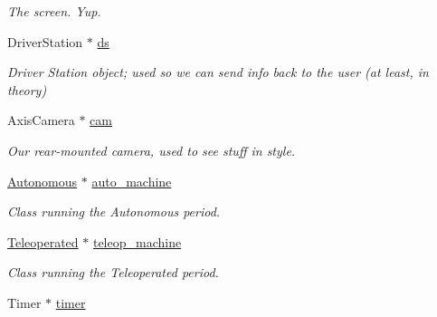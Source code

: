 \begin{DoxyCompactItemize}
\begin{DoxyCompactList}\small\item\em The screen. Yup. \item\end{DoxyCompactList}\item 
\hypertarget{class_builtin_default_code_a39f6383c7d191eeca78ab4a9865d6664}{
DriverStation $\ast$ \hyperlink{class_builtin_default_code_a39f6383c7d191eeca78ab4a9865d6664}{ds}}
\label{class_builtin_default_code_a39f6383c7d191eeca78ab4a9865d6664}

\begin{DoxyCompactList}\small\item\em Driver Station object; used so we can send info back to the user (at least, in theory) \item\end{DoxyCompactList}\item 
\hypertarget{class_builtin_default_code_aef2c4c3029fc5446af5117125ffdc555}{
AxisCamera $\ast$ \hyperlink{class_builtin_default_code_aef2c4c3029fc5446af5117125ffdc555}{cam}}
\label{class_builtin_default_code_aef2c4c3029fc5446af5117125ffdc555}

\begin{DoxyCompactList}\small\item\em Our rear-\/mounted camera, used to see stuff in style. \item\end{DoxyCompactList}\item 
\hypertarget{class_builtin_default_code_a23fafbc7100e3b5b50408d010b5f609b}{
\hyperlink{class_r_j_f_r_c2011_1_1_autonomous}{Autonomous} $\ast$ \hyperlink{class_builtin_default_code_a23fafbc7100e3b5b50408d010b5f609b}{auto\_\-machine}}
\label{class_builtin_default_code_a23fafbc7100e3b5b50408d010b5f609b}

\begin{DoxyCompactList}\small\item\em Class running the Autonomous period. \item\end{DoxyCompactList}\item 
\hypertarget{class_builtin_default_code_ad31f83ef30fd7bbb3bbe22895dfb9c99}{
\hyperlink{class_r_j_f_r_c2011_1_1_teleoperated}{Teleoperated} $\ast$ \hyperlink{class_builtin_default_code_ad31f83ef30fd7bbb3bbe22895dfb9c99}{teleop\_\-machine}}
\label{class_builtin_default_code_ad31f83ef30fd7bbb3bbe22895dfb9c99}

\begin{DoxyCompactList}\small\item\em Class running the Teleoperated period. \item\end{DoxyCompactList}\item 
\hypertarget{class_builtin_default_code_aaf59606d706817c312686afcd1f8f527}{
Timer $\ast$ \hyperlink{class_builtin_default_code_aaf59606d706817c312686afcd1f8f527}{timer}}
\label{class_builtin_default_code_aaf59606d706817c312686afcd1f8f527}


\end{DoxyCompactItemize}
